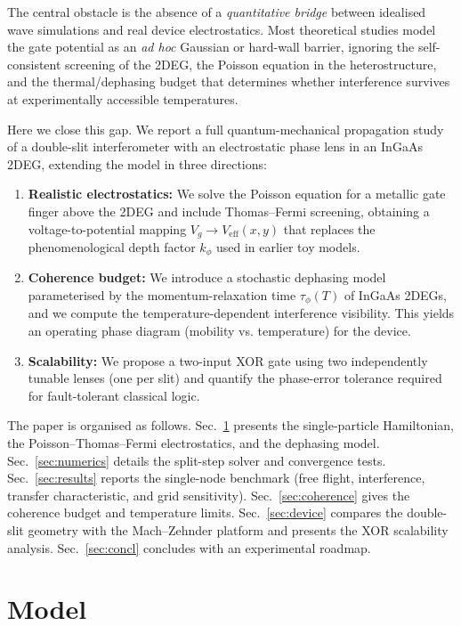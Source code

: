 \documentclass[11pt,a4paper]{article}
\begin{document}
The central obstacle is the absence of a \emph{quantitative bridge} between 
idealised wave simulations and real device electrostatics. Most theoretical 
studies model the gate potential as an \emph{ad hoc} Gaussian or hard-wall 
barrier, ignoring the self-consistent screening of the 2DEG, the Poisson 
equation in the heterostructure, and the thermal/dephasing budget that 
determines whether interference survives at experimentally accessible 
temperatures.

Here we close this gap. We report a full quantum-mechanical propagation study 
of a double-slit interferometer with an electrostatic phase lens in an InGaAs 
2DEG, extending the model in three directions:
\begin{enumerate}
  \item \textbf{Realistic electrostatics:} We solve the Poisson equation for 
  a metallic gate finger above the 2DEG and include Thomas--Fermi screening, 
  obtaining a voltage-to-potential mapping $V_g\to V_{\text{eff}}(x,y)$ that 
  replaces the phenomenological depth factor $k_\phi$ used in earlier toy 
  models.
  \item \textbf{Coherence budget:} We introduce a stochastic dephasing model 
  parameterised by the momentum-relaxation time $\tau_\phi(T)$ of InGaAs 2DEGs, 
  and we compute the temperature-dependent interference visibility. This yields 
  an operating phase diagram (mobility vs. temperature) for the device.
  \item \textbf{Scalability:} We propose a two-input XOR gate using two 
  independently tunable lenses (one per slit) and quantify the phase-error 
  tolerance required for fault-tolerant classical logic.
\end{enumerate}

The paper is organised as follows. Sec.~\ref{sec:model} presents the 
single-particle Hamiltonian, the Poisson--Thomas--Fermi electrostatics, and 
the dephasing model. Sec.~\ref{sec:numerics} details the split-step solver 
and convergence tests. Sec.~\ref{sec:results} reports the single-node 
benchmark (free flight, interference, transfer characteristic, and grid 
sensitivity). Sec.~\ref{sec:coherence} gives the coherence budget and 
temperature limits. Sec.~\ref{sec:device} compares the double-slit geometry 
with the Mach--Zehnder platform and presents the XOR scalability analysis. 
Sec.~\ref{sec:concl} concludes with an experimental roadmap.

\section{Model}
\label{sec:model}
\end{document}
